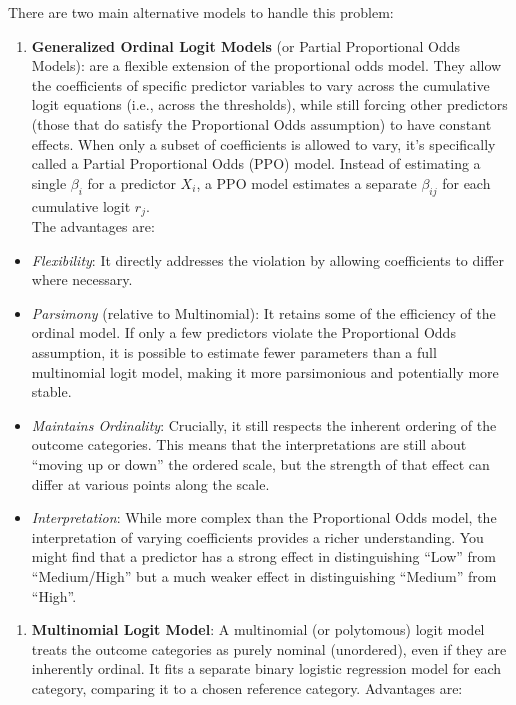 \documentclass[
  letterpaper,
  DIV=11,
  numbers=noendperiod]{scrartcl}
\providecommand{\tightlist}{%
  \setlength{\itemsep}{0pt}\setlength{\parskip}{0pt}}\usepackage{longtable,booktabs,array}
\begin{document}
There are two main alternative models to handle this problem:

\begin{enumerate}
\def\labelenumi{\arabic{enumi}.}
\tightlist
\item
  \textbf{Generalized Ordinal Logit Models} (or Partial Proportional
  Odds Models): are a flexible extension of the proportional odds model.
  They allow the coefficients of specific predictor variables to vary
  across the cumulative logit equations (i.e., across the thresholds),
  while still forcing other predictors (those that do satisfy the
  Proportional Odds assumption) to have constant effects. When only a
  subset of coefficients is allowed to vary, it's specifically called a
  Partial Proportional Odds (PPO) model. Instead of estimating a single
  \(\beta_i\) for a predictor \(X_i\), a PPO model estimates a separate
  \(\beta_{ij}\) for each cumulative logit \(r_j\).\\
  The advantages are:
\end{enumerate}

\begin{itemize}
\tightlist
\item
  \emph{Flexibility}: It directly addresses the violation by allowing
  coefficients to differ where necessary.
\item
  \emph{Parsimony} (relative to Multinomial): It retains some of the
  efficiency of the ordinal model. If only a few predictors violate the
  Proportional Odds assumption, it is possible to estimate fewer
  parameters than a full multinomial logit model, making it more
  parsimonious and potentially more stable.
\item
  \emph{Maintains Ordinality}: Crucially, it still respects the inherent
  ordering of the outcome categories. This means that the
  interpretations are still about ``moving up or down'' the ordered
  scale, but the strength of that effect can differ at various points
  along the scale.
\item
  \emph{Interpretation}: While more complex than the Proportional Odds
  model, the interpretation of varying coefficients provides a richer
  understanding. You might find that a predictor has a strong effect in
  distinguishing ``Low'' from ``Medium/High'' but a much weaker effect
  in distinguishing ``Medium'' from ``High''.
\end{itemize}

\begin{enumerate}
\def\labelenumi{\arabic{enumi}.}
\setcounter{enumi}{1}
\tightlist
\item
  \textbf{Multinomial Logit Model}: A multinomial (or polytomous) logit
  model treats the outcome categories as purely nominal (unordered),
  even if they are inherently ordinal. It fits a separate binary
  logistic regression model for each category, comparing it to a chosen
  reference category. Advantages are:
\end{enumerate}
\end{document}
